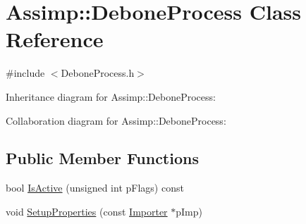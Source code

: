 \hypertarget{class_assimp_1_1_debone_process}{\section{Assimp\+:\+:Debone\+Process Class Reference}
\label{class_assimp_1_1_debone_process}
}


{\ttfamily \#include $<$Debone\+Process.\+h$>$}



Inheritance diagram for Assimp\+:\+:Debone\+Process\+:


Collaboration diagram for Assimp\+:\+:Debone\+Process\+:
\subsection*{Public Member Functions}
\begin{DoxyCompactItemize}
\item 
bool \hyperlink{class_assimp_1_1_debone_process_aa69ce4e81a06e41d176009bafa983d40}{Is\+Active} (unsigned int p\+Flags) const 
\item 
void \hyperlink{class_assimp_1_1_debone_process_ad062ecc02d4c77deed2028d952626526}{Setup\+Properties} (const \hyperlink{class_assimp_1_1_importer}{Importer} $\ast$p\+Imp)
\end{DoxyCompactItemize}
